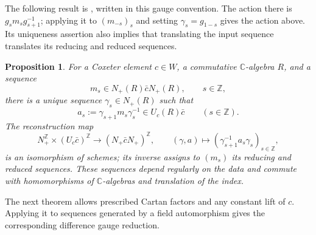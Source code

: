 \documentclass[11pt,leqno]{amsart}
\numberwithin{equation}{section}
\theoremstyle{plain}
\newtheorem{proposition}[theorem]{Proposition}
\theoremstyle{definition}
\theoremstyle{plain}
\theoremstyle{definition}
\theoremstyle{remark}
\begin{document}
The following result is \cite[Theorem~33 and Corollary~34]{FL2025}, written in this gauge convention.  The action there is $g_sm_sg_{s+1}^{-1}$; applying it to $(m_{-s})_s$ and setting $\gamma_s=g_{1-s}$ gives the action above.  Its uniqueness assertion also implies that translating the input sequence translates its reducing and reduced sequences.
\begin{proposition}\label{prop:sequence-Steinberg-cross-section}
For a Coxeter element $c\in W$, a commutative $\mathbb C$-algebra $R$, and a sequence
\[
 m_s\in N_+(R)\bar cN_+(R),\qquad s\in\mathbb Z,
\]
there is a unique sequence $\gamma_s\in N_+(R)$ such that
\[
 a_s:=\gamma_{s+1}m_s\gamma_s^{-1}\in U_c(R)\bar c
 \qquad(s\in\mathbb Z).
\]
The reconstruction map
\[
 N_+^{\mathbb Z}\times(U_c\bar c)^{\mathbb Z}
 \longrightarrow(N_+\bar cN_+)^{\mathbb Z},\qquad
 (\gamma,a)\longmapsto
       (\gamma_{s+1}^{-1}a_s\gamma_s)_{s\in\mathbb Z},
\]
is an isomorphism of schemes; its inverse assigns to $(m_s)$ its reducing and reduced sequences.  These sequences depend regularly on the data and commute with homomorphisms of $\mathbb C$-algebras and translation of the index.
\end{proposition}

The next theorem allows prescribed Cartan factors and any constant lift of $c$.  Applying it to sequences generated by a field automorphism gives the corresponding difference gauge reduction.
\end{document}
